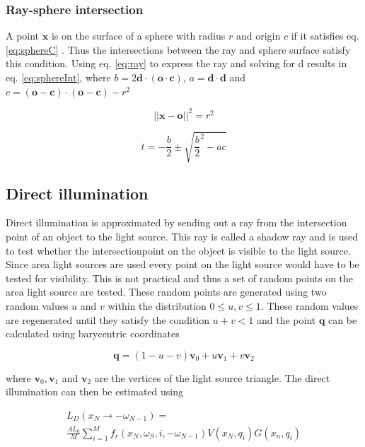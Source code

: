 \documentclass[twocolumn]{article}
\begin{document}
\subsubsection{Ray-sphere intersection}
A point $\mathbf{x}$ is on the surface of a sphere with radius $r$ and origin $c$ if it satisfies eq. \ref{eq:sphereC} \cite{hq}. Thus the intersections between the ray and sphere surface satisfy this condition. Using eq. \ref{eq:ray} to express the ray and solving for d results in eq. \ref{eq:sphereInt}, where $b = 2\mathbf{d} \cdot (\mathbf{o} \cdot \mathbf{c})$, $a = \mathbf{d} \cdot \mathbf{d}$ and $c = (\mathbf{o} - \mathbf{c}) \cdot (\mathbf{o} - \mathbf{c}) - r^2$

\begin{equation}
	\label{eq:sphereC}
	||\mathbf{x} - \mathbf{o}||^2 = r^2
\end{equation}

\begin{equation}
	\label{eq:sphereInt}
	t = - \frac{b}{2} \pm \sqrt{\frac{b}{2}^2 - ac}
\end{equation}

\subsection{Direct illumination}
Direct illumination is approximated by sending out a ray from the intersection point of an object to the light source. This ray is called a shadow ray and is used to test whether the intersectionpoint on the object is visible to the light source. Since area light sources are used every point on the light source would have to be tested for visibility. This is not practical and thus a set of random points on the area light source are tested. These random points are generated using two random values $u$ and $v$ within the distribution $0 \leq u,v \leq 1$. These random values are regenerated until they satisfy the condition $u + v < 1$ and the point $\mathbf{q}$ can be calculated using barycentric coordinates

\begin{equation*}
	\mathbf{q} = (1 - u - v)\mathbf{v}_0 + u\mathbf{v}_1 + v\mathbf{v}_2
\end{equation*}

where $\mathbf{v}_0, \mathbf{v}_1$ and $\mathbf{v}_2$ are the vertices of the light source triangle. The direct illumination can then be estimated using

\begin{align*}
	L_D(x_N \rightarrow -\omega_{N-1}) = \\
	 \frac{AL_0}{M} \sum_{i=1}^{M}f_r(x_N, \omega_S, i, -\omega_{N-1})V(x_N, q_i)G(x_n, q_i)
\end{align*}
\end{document}
